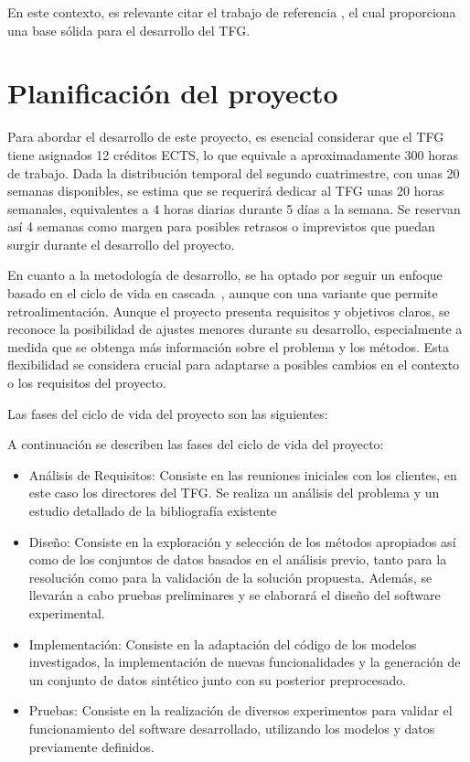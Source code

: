 En este contexto, es relevante citar el trabajo de referencia \cite{14}, el cual proporciona una base sólida para el desarrollo del TFG.

\section{Planificación del proyecto}

Para abordar el desarrollo de este proyecto, es esencial considerar que el TFG tiene asignados 12 créditos ECTS, lo que equivale a aproximadamente 300 horas de trabajo. Dada la distribución temporal del segundo cuatrimestre, con unas 20 semanas disponibles, se estima que se requerirá dedicar al TFG unas 20 horas semanales, equivalentes a 4 horas diarias durante 5 días a la semana. Se reservan así 4 semanas como margen para posibles retrasos o imprevistos que puedan surgir durante el desarrollo del proyecto.

En cuanto a la metodología de desarrollo, se ha optado por seguir un enfoque basado en el ciclo de vida en cascada~\cite{38}, aunque con una variante que permite retroalimentación. Aunque el proyecto presenta requisitos y objetivos claros, se reconoce la posibilidad de ajustes menores durante su desarrollo, especialmente a medida que se obtenga más información sobre el problema y los métodos. Esta flexibilidad se considera crucial para adaptarse a posibles cambios en el contexto o los requisitos del proyecto.

Las fases del ciclo de vida del proyecto son las siguientes:

A continuación se describen las fases del ciclo de vida del proyecto:
\begin{itemize}
	\item Análisis de Requisitos: Consiste en las reuniones iniciales con los clientes, en este caso los directores del TFG. Se realiza un análisis del problema y un estudio detallado de la bibliografía existente
	\item Diseño: Consiste en la exploración y selección de los métodos apropiados así como de los conjuntos de datos basados en el análisis previo, tanto para la resolución como para la validación de la solución propuesta. Además, se llevarán a cabo pruebas preliminares y se elaborará el diseño del software experimental.
	\item Implementación: Consiste en la adaptación del código de los modelos investigados, la implementación de nuevas funcionalidades y la generación de un conjunto de datos sintético junto con su posterior preprocesado.
	\item Pruebas: Consiste en la realización de diversos experimentos para validar el funcionamiento del software desarrollado, utilizando los modelos y datos previamente definidos.
\end{itemize}

